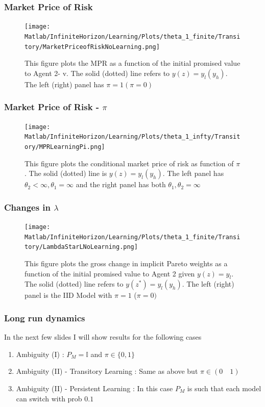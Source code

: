 \documentclass{beamer}
\theoremstyle{definition}
\begin{document}
\begin{frame}
\frametitle{Market Price of Risk}
\begin{figure}[htbp]
\centering
	  \texttt{[image: Matlab/InfiniteHorizon/Learning/Plots/theta\_1\_finite/Transitory/MarketPriceofRiskNoLearning.png]}

	\caption{\small {This figure plots the MPR as a function of the initial promised
value to Agent 2- v. The  solid (dotted) line refers to $y(z)=y_l (y_h)$. The
left (right) panel has $\pi=1 (\pi=0)$}}
	\label{fig:MPRNoLearning}
\end{figure} 

\end{frame}
\begin{frame}
\frametitle{Market Price of Risk - $\pi$}
\begin{figure}[htbp]
\centering
	  \texttt{[image: Matlab/InfiniteHorizon/Learning/Plots/theta\_1\_infty/Transitory/MPRLearningPi.png]}

	\caption{ \small{This figure plots the conditional market price of risk as function of $\pi$. The solid (dotted) line is $y(z)=y_l (y_h)$. The left panel has $\theta_2<\infty,\theta_1=\infty $ and the right panel has both $\theta_1,\theta_2=\infty$}}
 
	\label{fig:MPRLearningPi}
\end{figure} 



\end{frame}

\begin{frame}
\frametitle{Changes in $\lambda$}
\begin{figure}[htbp]
\centering
	  \texttt{[image: Matlab/InfiniteHorizon/Learning/Plots/theta\_1\_finite/Transitory/LambdaStarLNoLearning.png]}

	\caption{This figure plots the gross change in implicit Pareto weights as a function 
of the initial promised value to Agent 2 given $y(z)=y_l$. The solid (dotted) line refers to
 $y(z^*)=y_l (y_h)$. The left (right) panel is the IID Model with $\pi=1$ ($\pi=0)$}
	\label{fig:LambdaStarLStarNoLearning}
\end{figure} 
\end{frame}


\begin{frame}
\frametitle{Long run dynamics}
In the next few slides I will show results for the following cases
\begin{enumerate}	
\item Ambiguity (I) : $P_M=\mathbb{I}$ and $\pi \in\{0,1\}$ 
\item Ambiguity (II) - Transitory Learning : Same as above but $\pi \in(0 \quad 1)$
\item Ambiguity (II) - Persistent Learning : In this case $P_M$ is such that each model
  can switch with prob $0.1$
\end{enumerate}
\end{frame}
\end{document}
